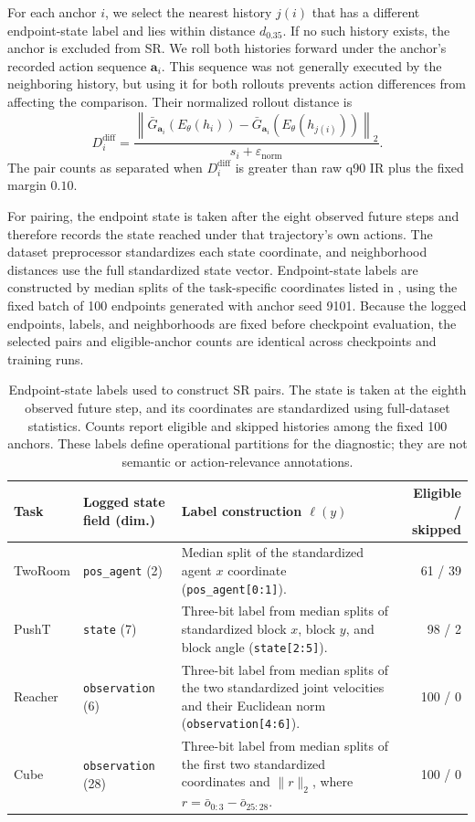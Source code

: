 \documentclass[10pt]{article}
\newcommand{\code}[1]{\texttt{#1}}
\begin{document}
For each anchor $i$, we select the nearest history $j(i)$ that has a different
endpoint-state label and lies within distance $d_{0.35}$. If no such history
exists, the anchor is excluded from SR. We roll both histories forward under
the anchor's recorded action sequence $\mathbf a_i$. This sequence was not
generally executed by the neighboring history, but using it for both rollouts
prevents action differences from affecting the comparison. Their normalized
rollout distance is
\begin{equation}
D_i^{\mathrm{diff}}
=
\frac{
\left\|\bar G_{\mathbf a_i}(E_\theta(h_i))
-\bar G_{\mathbf a_i}(E_\theta(h_{j(i)}))\right\|_2
}{s_i+\varepsilon_{\mathrm{norm}}}.
\label{eq:different-state-distance}
\end{equation}
The pair counts as separated when $D_i^{\mathrm{diff}}$ is greater than raw
q90 IR plus the fixed margin $0.10$.

For pairing, the endpoint state is taken after the eight observed future steps
and therefore records the state reached under that trajectory's own actions.
The dataset preprocessor standardizes each state coordinate, and neighborhood
distances use the full standardized state vector. Endpoint-state labels are
constructed by median splits of the task-specific coordinates listed in
, using the fixed batch of 100 endpoints generated with
anchor seed 9101. Because the logged endpoints, labels, and neighborhoods are
fixed before checkpoint evaluation, the selected pairs and eligible-anchor
counts are identical across checkpoints and training runs.

\begin{table}[H]
\centering
\caption{Endpoint-state labels used to construct SR pairs. The state is taken
at the eighth observed future step, and its coordinates are standardized using
full-dataset statistics. Counts report eligible and skipped histories among
the fixed 100 anchors. These labels define operational partitions for the
diagnostic; they are not semantic or action-relevance annotations.}
\label{tab:sr-labels}
\footnotesize
\setlength{\tabcolsep}{3pt}
\begin{tabularx}{\linewidth}{l l X r}
\toprule
Task & Logged state field (dim.) & Label construction $\ell(y)$ & Eligible / skipped \\
\midrule
TwoRoom & \code{pos\_agent} (2) & Median split of the standardized agent $x$ coordinate (\code{pos\_agent[0:1]}). & 61 / 39 \\
PushT & \code{state} (7) & Three-bit label from median splits of standardized block $x$, block $y$, and block angle (\code{state[2:5]}). & 98 / 2 \\
Reacher & \code{observation} (6) & Three-bit label from median splits of the two standardized joint velocities and their Euclidean norm (\code{observation[4:6]}). & 100 / 0 \\
Cube & \code{observation} (28) & Three-bit label from median splits of the first two standardized coordinates and $\|r\|_2$, where $r=\bar o_{0:3}-\bar o_{25:28}$. & 100 / 0 \\
\bottomrule
\end{tabularx}
\end{table}
\end{document}
